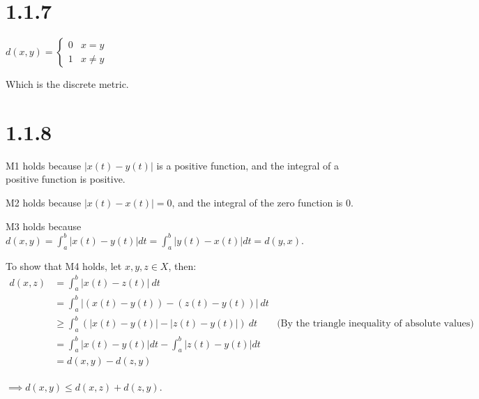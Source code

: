 \documentclass{article}
\begin{document}
\section*{1.1.7}

$d(x,y) = \begin{cases}
  0 & x=y \\
  1 & x\not=y
\end{cases}$
\newline

\noindent
Which is the discrete metric.

\section*{1.1.8}

M1 holds because $|x(t) - y(t)|$ is a positive function, and the integral of a positive function is positive.
\newline

\noindent
M2 holds because $|x(t) - x(t)| = 0$, and the integral of the zero function is 0.
\newline

\noindent
M3 holds because $d(x, y) = \int_{a}^{b} |x(t) - y(t)| dt = \int_{a}^{b}|y(t) - x(t)| dt = d(y, x)$.
\newline

\noindent
To show that M4 holds, let $x, y, z \in X$, then:
\begin{align*}
  d(x,z) 
  &= \int_{a}^{b} |x(t) - z(t)| \ dt &&\\
  &= \int_{a}^{b} |(x(t) - y(t)) - (z(t) - y(t))| \ dt &&\\
  &\geq \int_{a}^{b} (|x(t) - y(t)| - |z(t) - y(t)|) \ dt \qquad \text{(By the triangle inequality of absolute values)} &&\\
  &= \int_{a}^{b} |x(t) - y(t)| dt - \int_{a}^{b} |z(t) - y(t)| dt &&\\
  &= d(x, y) - d(z, y) &&\\
\end{align*}

\noindent
$\implies d(x, y) \leq d(x, z) + d(z, y).$

\newpage
\end{document}
